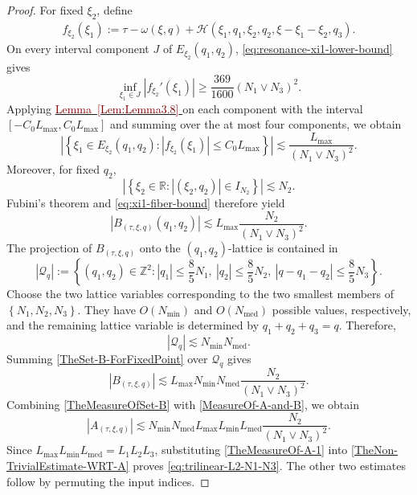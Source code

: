\documentclass[12pt,oneside,reqno]{amsart}
\newcommand{\lemref}[1]{%
    \hyperref[#1]{%
        \textcolor{Maroon}{Lemma~\ref*{#1}}%
    }%
}
\numberwithin{equation}{section}
\theoremstyle{plain}
\def\R{{\mathbb R}}
\def\Z{{\mathbb Z}}
\newcommand{\abs}[1]{%
    \left|#1\right|%
}
\newcommand{\brs}[1]{%
    \left\{#1\right\}
}
\begin{document}
\begin{proof}
For fixed $\xi_2$, define
\begin{equation}
\begin{aligned}
f_{\xi_2}(\xi_1)
:=
\tau-\omega(\xi,q)
+
\mathcal H(
    \xi_1,q_1,
    \xi_2,q_2,
    \xi-\xi_1-\xi_2,q_3
).
\end{aligned}
\end{equation}
On every interval component $J$ of $E_{\xi_2}(q_1,q_2)$,
\eqref{eq:resonance-xi1-lower-bound} gives
\begin{equation*}
    \inf_{\xi_1\in J}
    \abs{f_{\xi_2}'(\xi_1)}
    \geq
    \frac{369}{1600}(N_1\vee N_3)^2.
\end{equation*}
Applying \lemref{Lem:Lemma3.8} on each component with the interval
$[-C_0L_{\max},C_0L_{\max}]$ and summing over the at most four components,
we obtain
\begin{equation}
\label{eq:xi1-fiber-bound}
\abs{
\brs{
\xi_1\in E_{\xi_2}(q_1,q_2):
\abs{f_{\xi_2}(\xi_1)}\leq C_0L_{\max}
}}
\lesssim
\frac{L_{\max}}{(N_1\vee N_3)^2}.
\end{equation}
Moreover, for fixed $q_2$,
\begin{equation*}
    \abs{
    \brs{
    \xi_2\in\R:
    \abs{(\xi_2,q_2)}\in I_{N_2}
    }}
    \lesssim
    N_2.
\end{equation*}
Fubini's theorem and \eqref{eq:xi1-fiber-bound} therefore yield
\begin{equation}
\label{TheSet-B-ForFixedPoint}
    \abs{B_{(\tau,\xi,q)}(q_1,q_2)}
    \lesssim
    L_{\max}\frac{N_2}{(N_1\vee N_3)^2}.
\end{equation}
The projection of $B_{(\tau,\xi,q)}$ onto the $(q_1,q_2)$-lattice is
contained in
\begin{equation*}
| \mathcal Q_q |
:=
\left\{
(q_1,q_2)\in\Z^2:
\abs{q_1}\leq\frac85N_1,
\ \abs{q_2}\leq\frac85N_2,
\ \abs{q-q_1-q_2}\leq\frac85N_3
\right\}.
\end{equation*}
Choose the two lattice variables corresponding to the two smallest members
of $\brs{N_1,N_2,N_3}$. They have $O(N_{\min})$ and $O(N_{\mathrm{med}})$
possible values, respectively, and the remaining lattice variable is determined by
$q_1+q_2+q_3=q$. Therefore,
\begin{equation*}
    |\mathcal Q_q |
    \lesssim
    N_{\min}N_{\mathrm{med}}.
\end{equation*}
Summing \eqref{TheSet-B-ForFixedPoint} over $\mathcal Q_q$ gives
\begin{equation}
\label{TheMeasureOfSet-B}
    \abs{B_{(\tau,\xi,q)}}
    \lesssim
    L_{\max}N_{\min}N_{\mathrm{med}}
    \frac{N_2}{(N_1\vee N_3)^2}.
\end{equation}
Combining \eqref{TheMeasureOfSet-B} with \eqref{MeasureOf-A-and-B}, we obtain
\begin{equation}
\label{TheMeasureOf-A-1}
    \abs{A_{(\tau,\xi,q)}}
    \lesssim
    N_{\min}N_{\mathrm{med}}L_{\max}L_{\min}L_{\mathrm{med}}
    \frac{N_2}{(N_1\vee N_3)^2}.
\end{equation}
Since $L_{\max}L_{\min}L_{\mathrm{med}}=L_1L_2L_3$, substituting
\eqref{TheMeasureOf-A-1} into \eqref{TheNon-TrivialEstimate-WRT-A} proves
\eqref{eq:trilinear-L2-N1-N3}. The other two estimates follow
by permuting the input indices.


\end{proof}
\end{document}
